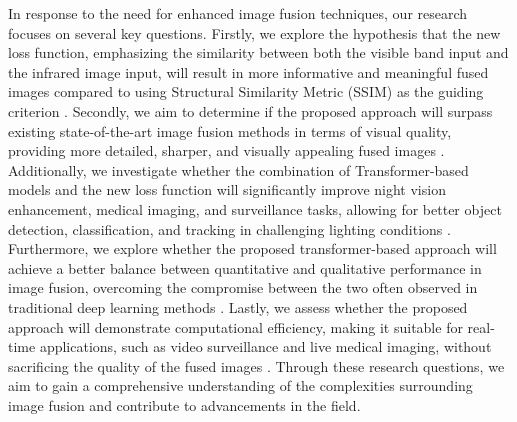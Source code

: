 In response to the need for enhanced image fusion techniques, our research focuses on several key questions. Firstly, we explore the hypothesis that the new loss function, emphasizing the similarity between both the visible band input and the infrared image input, will result in more informative and meaningful fused images compared to using Structural Similarity Metric (SSIM) as the guiding criterion \cite{li2021rfn}. Secondly, we aim to determine if the proposed approach will surpass existing state-of-the-art image fusion methods in terms of visual quality, providing more detailed, sharper, and visually appealing fused images \cite{li2021rfn}. Additionally, we investigate whether the combination of Transformer-based models and the new loss function will significantly improve night vision enhancement, medical imaging, and surveillance tasks, allowing for better object detection, classification, and tracking in challenging lighting conditions \cite{dosovitskiy2020image, liu2021swin}. Furthermore, we explore whether the proposed transformer-based approach will achieve a better balance between quantitative and qualitative performance in image fusion, overcoming the compromise between the two often observed in traditional deep learning methods \cite{dosovitskiy2020image, liu2021swin}. Lastly, we assess whether the proposed approach will demonstrate computational efficiency, making it suitable for real-time applications, such as video surveillance and live medical imaging, without sacrificing the quality of the fused images \cite{dosovitskiy2020image, liu2021swin}. Through these research questions, we aim to gain a comprehensive understanding of the complexities surrounding image fusion and contribute to advancements in the field.